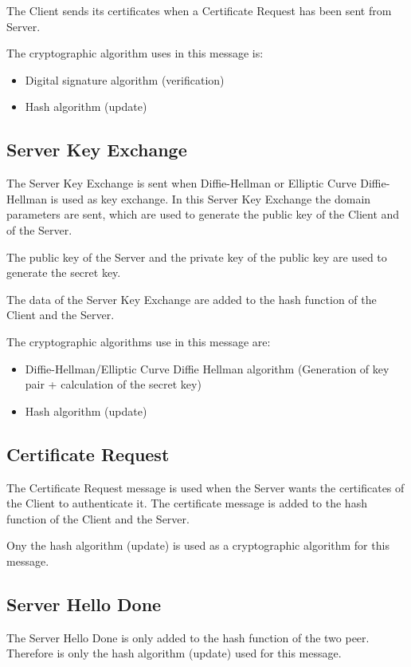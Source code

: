 The Client sends its certificates when a Certificate Request has been sent from
Server.

The cryptographic algorithm uses in this message is:
\begin{itemize}[noitemsep]
  \item Digital signature algorithm (verification)
  \item Hash algorithm (update)
\end{itemize}

\subsection*{Server Key Exchange}
The Server Key Exchange is sent when Diffie-Hellman or Elliptic Curve
Diffie-Hellman  is used as key exchange.
In this Server Key Exchange the domain parameters are sent, which are used to
generate the public key of the Client and of the Server.

The public key of the Server and the private key of the public key are used to
generate the secret key.

The data of the Server Key Exchange are added to the hash function of the Client
and the Server.

The cryptographic algorithms use in this message are:
\begin{itemize}[noitemsep]
  \item Diffie-Hellman/Elliptic Curve Diffie Hellman algorithm (Generation of
  key pair + calculation of the secret key)
  \item Hash algorithm (update)
\end{itemize}

\subsection*{Certificate Request}
The Certificate Request message is used when the Server wants the certificates
of the Client to authenticate it.
The certificate message is added to the hash function of the Client and the
Server.

Ony the hash algorithm (update) is used as a cryptographic algorithm for this
message.

\subsection*{Server Hello Done}
The Server Hello Done is only added to the hash function of the two peer.
Therefore is only the hash algorithm (update) used for this message.

